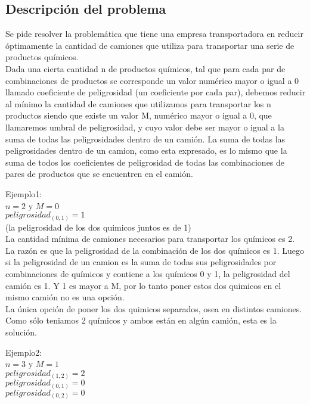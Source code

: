 \subsection{Descripci\'on del problema}

\noindent
Se pide resolver la problem\'atica que tiene una empresa transportadora en reducir \'optimamente la cantidad de camiones que utiliza para transportar una serie de productos qu\'imicos. \\
Dada una cierta cantidad n de productos qu\'imicos, tal que para cada par de combinaciones de productos se corresponde un valor num\'erico mayor o igual a 0 llamado coeficiente de peligrosidad (un coeficiente por cada par), debemos reducir al m\'inimo la cantidad de camiones que utilizamos para transportar los n productos siendo que existe un valor M, num\'erico mayor o igual a 0, que llamaremos umbral de peligrosidad, y cuyo valor debe ser mayor o igual a la suma de todas las peligrosidades dentro de un cami\'on. La suma de todas las peligrosidades dentro de un camion, como esta expresado, es lo mismo que la suma de todos los coeficientes de peligrosidad de todas las combinaciones de pares de productos que se encuentren en el cami\'on. 
\bigskip

\noindent
Ejemplo1: \\
$n = 2$ y $M = 0$ \\ 
$peligrosidad_{(0,1)} = 1$ \\
(la peligrosidad de los dos quimicos juntos es de 1) \\

\noindent
La cantidad m\'inima de camiones necesarios para transportar los qu\'imicos es 2. La raz\'on es que la peligrosidad de la combinaci\'on de los dos qu\'imicos es 1. Luego si la peligrosidad de un camion es la suma de todas sus peligrosidades por combinaciones de qu\'imicos y contiene a los qu\'imicos 0 y 1, la peligrosidad del cami\'on es 1. Y 1 es mayor a M, por lo tanto poner estos dos quimicos en el mismo cami\'on no es una opci\'on. \\
La \'unica opci\'on de poner los dos quimicos separados, osea en distintos camiones. Como s\'olo teniamos 2 qu\'imicos y ambos est\'an en alg\'un cami\'on, esta es la soluci\'on. 
\bigskip
\bigskip

\noindent
Ejemplo2: \\
$n = 3$ y $M = 1$ \\
$peligrosidad_{(1,2)} = 2$ \\
$peligrosidad_{(0,1)} = 0$ \\
$peligrosidad_{(0,2)} = 0$ \\


